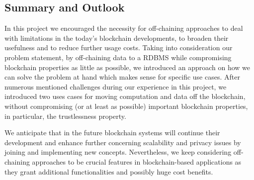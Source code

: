 \subsection{Summary and Outlook}
In this project we encouraged the necessity for off-chaining approaches to deal with limitations in the today’s blockchain developments, to broaden their usefulness and to reduce further usage costs. Taking into consideration our problem statement, by off-chaining data to a RDBMS while compromising blockchain properties as little as possible, we introduced an approach on how we can solve the problem at hand which makes sense for specific use cases. After numerous mentioned challenges during our experience in this project, we introduced two uses cases for moving computation and data off the blockchain, without compromising (or at least as possible) important blockchain properties, in particular, the trustlessness property.

We anticipate that in the future blockchain systems will continue their development and enhance further concerning scalability and privacy issues by joining and implementing new concepts. Nevertheless, we keep considering off-chaining approaches to be crucial features in blockchain-based applications as they grant additional functionalities and possibly huge cost benefits.


\newpage

